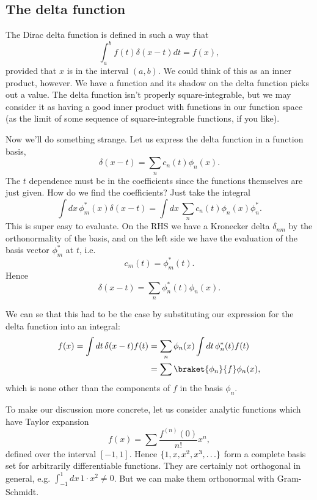 \subsection*{The delta function}
The Dirac delta function is defined in such a way that
\begin{equation}
    \int_a^b f(t) \delta (x-t)dt = f(x),
\end{equation}
provided that $x$ is in the interval $(a,b)$. We could think of this as an inner product, however. We have a function and its shadow on the delta function picks out a value. The delta function isn't properly square-integrable, but we may consider it as having a good inner product with functions in our function space (as the limit of some sequence of square-integrable functions, if you like).

Now we'll do something strange. Let us express the delta function in a function basis,
\begin{equation}
     \delta(x-t)=\sum_n c_n(t) \phi_n(x).
\end{equation}
The $t$ dependence must be in the coefficients since the functions themselves are just given. How do we find the coefficients? Just take the integral
\begin{equation}
    \int dx\,\phi_m^*(x) \delta(x-t) = \int dx\,\sum_n c_n(t) \phi_n(x) \phi_n^*.
\end{equation}
This is super easy to evaluate. On the RHS we have a Kronecker delta $\delta_{nm}$ by the orthonormality of the basis, and on the left side we have the evaluation of the basis vector $\phi_m^*$ at $t$, i.e.
\begin{equation}
    c_m(t)=\phi_m^*(t).
\end{equation}
Hence
\begin{equation}
    \delta(x-t)=\sum_n \phi_n^*(t) \phi_n(x).
\end{equation}

We can se that this had to be the case by substituting our expression for the delta function into an integral:
\begin{align}
    f(x) = \int dt\, \delta(x-t) f(t) &= \sum_n \phi_n(x) \int dt\, \phi_n^*(t) f(t)\\
        &= \sum \braket{\phi_n}{f} \phi_n(x),
\end{align}
which is none other than the components of $f$ in the basis $\phi_n$.

To make our discussion more concrete, let us consider analytic functions which have Taylor expansion
\begin{equation}
    f(x)=\sum \frac{f^{(n)}(0)}{n!} x^n,
\end{equation}
defined over the interval $[-1,1]$. Hence $\{1,x,x^2,x^3,\ldots\}$ form a complete basis set for arbitrarily differentiable functions. They are certainly not orthogonal in general, e.g. $\int_{-1}^1 dx\, 1\cdot x^2 \neq 0$. But we can make them orthonormal with Gram-Schmidt.

